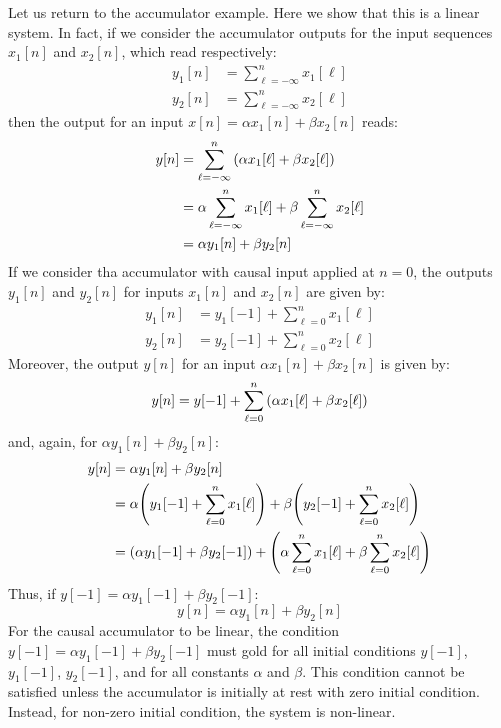 \documentclass[../../main/main.tex]{subfiles}
\begin{document}
\medskip
{}
Let us return to the accumulator example. Here we show that this is a linear system. In fact, if we consider the accumulator outputs for the input sequences \( x_{1}[n] \) and \( x_{2}[n] \), which read respectively:
\begin{align}
    y_{1}[n] &= \sum_{\ell = -\infty}^{n} x_{1}[\ell]   \\
    y_{2}[n] &= \sum_{\ell = -\infty}^{n} x_{2}[\ell]
\end{align}
then the output for an input \( x[n] = \alpha x_{1}[n] + \beta x_{2}[n] \) reads:
\begin{align}
    y[n]
    &=
        \sum_{\ell = -\infty}^{n} \qty(\alpha x_{1}[\ell] + \beta x_{2}[\ell])  \nonumber   \\
    &=
        \alpha \sum_{\ell = -\infty}^{n} x_{1}[\ell] + \beta \sum_{\ell = -\infty}^{n} x_{2}[\ell]  \nonumber   \\
    &=
        \alpha y_{1}[n] + \beta y_{2}[n]
\end{align}
If we consider tha accumulator with causal input applied at \( n = 0 \), the outputs \( y_{1}[n] \) and \( y_{2}[n] \) for inputs \( x_{1}[n] \) and \( x_{2}[n] \) are given by:
\begin{align}
    y_{1}[n] &= y_{1}[-1] + \sum_{\ell = 0}^{n} x_{1}[\ell] \\
    y_{2}[n] &= y_{2}[-1] + \sum_{\ell = 0}^{n} x_{2}[\ell]
\end{align}
Moreover, the output \( y[n] \) for an input \( \alpha x_{1}[n] + \beta x_{2}[n] \) is given by:
\begin{equation}
    y[n]
    =
    y[-1] + \sum_{\ell = 0}^{n} \qty(\alpha x_{1}[\ell] + \beta x_{2}[\ell])
    \label{eq:L03_S25_1}
\end{equation}
and, again, for \( \alpha y_{1}[n] + \beta y_{2}[n] \):
\begin{align}
    y[n]
    &=
        \alpha y_{1}[n] + \beta y_{2}[n]    \nonumber   \\
    &=
        \alpha \qty(
            y_{1}[-1] + \sum_{\ell = 0}^{n} x_{1}[\ell]
        ) +
        \beta \qty(
            y_{2}[-1] + \sum_{\ell = 0}^{n} x_{2}[\ell]
        )   \nonumber   \\
    &=
        \qty(
            \alpha y_{1}[-1] + \beta y_{2}[-1]
        ) +
        \qty(
            \alpha \sum_{\ell = 0}^{n} x_{1}[\ell] + \beta \sum_{\ell = 0}^{n} x_{2}[\ell]
        )
\end{align}
Thus, if \( y[-1] = \alpha y_{1}[-1] + \beta y_{2}[-1] \):
\begin{equation}
    y[n]
    =
    \alpha y_{1}[n] + \beta y_{2}[n]
    \label{eq:L03_S26_1}
\end{equation}
For the causal accumulator to be linear, the condition \( y[-1] = \alpha y_{1}[-1] + \beta y_{2}[-1] \) must gold for all initial conditions \( y[-1] \), \( y_{1}[-1] \), \( y_{2}[-1] \), and for all constants \( \alpha \) and \( \beta \). This condition cannot be satisfied unless the accumulator is initially at rest with zero initial condition. Instead, for non-zero initial condition, the system is non-linear.
\end{document}
